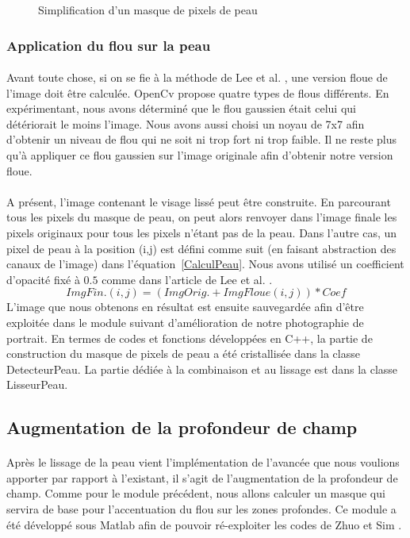 \documentclass[11pt, french,screen]{report-rd-info}
\begin{document}
\begin{figure}[htp]
 \caption{Simplification d'un masque de pixels de peau}
 \label{fig:MasquePeau}
\end{figure}


\subsubsection{Application du flou sur la peau}
\paragraph*{}
Avant toute chose, si on se fie à la méthode de Lee et al. \cite{Lee}, une version floue de l'image doit être calculée. OpenCv propose quatre types de flous différents. En expérimentant, nous avons déterminé que le flou gaussien était celui qui détériorait le moins l'image. Nous avons aussi choisi un noyau de 7x7 afin d'obtenir un niveau de flou qui ne soit ni trop fort ni trop faible. Il ne reste plus qu'à appliquer ce flou gaussien sur l'image originale afin d'obtenir notre version floue.

\paragraph*{}
A présent, l'image contenant le visage lissé peut être construite. En parcourant tous les pixels du masque de peau, on peut alors renvoyer dans l'image finale les pixels originaux pour tous les pixels n'étant pas de la peau. Dans l'autre cas, un pixel de peau à la position (i,j) est défini comme suit (en faisant abstraction des canaux de l'image) dans l'équation~\ref{CalculPeau}. Nous avons utilisé un coefficient d'opacité fixé à $0.5$ comme dans l'article de Lee et al. \cite{Lee}.
\begin{equation}
ImgFin.(i,j) = (ImgOrig. + ImgFloue(i,j)) * Coef
\label{CalculPeau}
\end{equation}
L'image que nous obtenons en résultat est ensuite sauvegardée afin d'être exploitée dans le module suivant d'amélioration de notre photographie de portrait. En termes de codes et fonctions développées en C++, la partie de construction du masque de pixels de peau a été cristallisée dans la classe DetecteurPeau. La partie dédiée à la combinaison et au lissage est dans la classe LisseurPeau.


\subsection{Augmentation de la profondeur de champ}
\paragraph*{}
Après le lissage de la peau vient l'implémentation de l'avancée que nous voulions apporter par rapport à l'existant, il s'agit de l'augmentation de la profondeur de champ. Comme pour le module précédent, nous allons calculer un masque qui servira de base pour l'accentuation du flou sur les zones profondes. Ce module a été développé sous Matlab afin de pouvoir ré-exploiter les codes de Zhuo et Sim \cite{Zhuo2011}.
\end{document}
